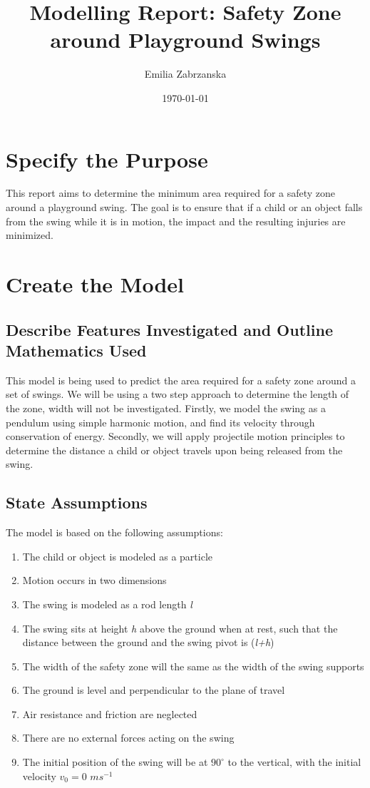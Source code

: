 \documentclass{article}
\title{Modelling Report: Safety Zone around Playground Swings}
\author{Emilia Zabrzanska}
\date{\today}
\begin{document}
\setlength{\parskip}{1em}

\maketitle

\pagebreak

\section*{Specify the Purpose}

This report aims to determine the minimum area required for a safety zone around a playground swing. The goal is to ensure that if a child or an object falls from the swing while it is in motion, the impact and the resulting injuries are minimized.

\section*{Create the Model}

\subsection*{Describe Features Investigated and Outline Mathematics Used}
This model is being used to predict the area required for a safety zone around a set of swings. We will be using a two step approach to determine the length of  the zone, width will not be investigated. Firstly, we model the swing as a pendulum using simple harmonic motion, and find its velocity through conservation of energy. Secondly, we will apply projectile motion principles to determine the distance a child or object travels upon being released from the swing.

\subsection*{State Assumptions}
The model is based on the following assumptions:
\begin{enumerate}
    \item The child or object is modeled as a particle
    \item Motion occurs in two dimensions
    \item The swing is modeled as a rod length \textit{l} 
    \item The swing sits at height \textit{h} above the ground when at rest, such that the distance between the ground and the swing pivot is (\textit{l+h})
    \item The width of the safety zone will the same as the width of the swing supports
    \item The ground is level and perpendicular to the plane of travel
    \item Air resistance and friction are neglected
    \item There are no external forces acting on the swing 
    \item The initial position of the swing will be at  $90^\circ$ to the vertical, with the initial velocity  $v_0 = 0$ $ms^{-1}$  
\end{enumerate}
\end{document}
